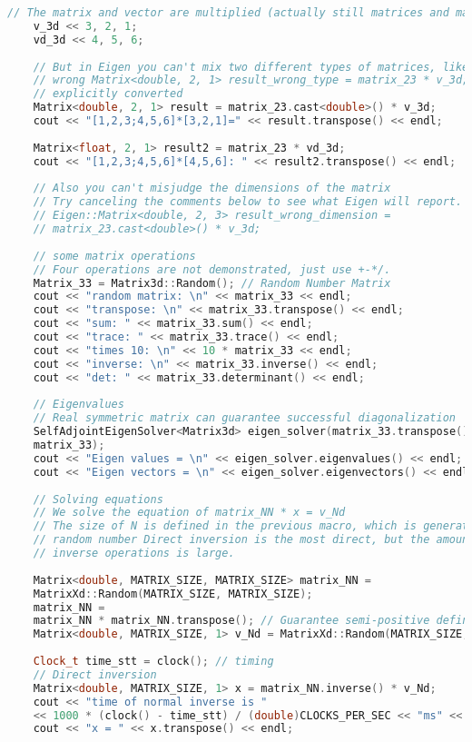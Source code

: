 \begin{lstlisting}[language=c++,caption=slambook2/ch3/useEigen/eigenMatrix.cpp]
    // The matrix and vector are multiplied (actually still matrices and matrices)
    v_3d << 3, 2, 1;
    vd_3d << 4, 5, 6;
    
    // But in Eigen you can't mix two different types of matrices, like this is
    // wrong Matrix<double, 2, 1> result_wrong_type = matrix_23 * v_3d; should be
    // explicitly converted
    Matrix<double, 2, 1> result = matrix_23.cast<double>() * v_3d;
    cout << "[1,2,3;4,5,6]*[3,2,1]=" << result.transpose() << endl;
    
    Matrix<float, 2, 1> result2 = matrix_23 * vd_3d;
    cout << "[1,2,3;4,5,6]*[4,5,6]: " << result2.transpose() << endl;
    
    // Also you can't misjudge the dimensions of the matrix
    // Try canceling the comments below to see what Eigen will report.
    // Eigen::Matrix<double, 2, 3> result_wrong_dimension =
    // matrix_23.cast<double>() * v_3d;
    
    // some matrix operations
    // Four operations are not demonstrated, just use +-*/.
    Matrix_33 = Matrix3d::Random(); // Random Number Matrix
    cout << "random matrix: \n" << matrix_33 << endl;
    cout << "transpose: \n" << matrix_33.transpose() << endl;
    cout << "sum: " << matrix_33.sum() << endl;
    cout << "trace: " << matrix_33.trace() << endl;
    cout << "times 10: \n" << 10 * matrix_33 << endl;
    cout << "inverse: \n" << matrix_33.inverse() << endl;
    cout << "det: " << matrix_33.determinant() << endl;
    
    // Eigenvalues
    // Real symmetric matrix can guarantee successful diagonalization
    SelfAdjointEigenSolver<Matrix3d> eigen_solver(matrix_33.transpose() *
    matrix_33);
    cout << "Eigen values = \n" << eigen_solver.eigenvalues() << endl;
    cout << "Eigen vectors = \n" << eigen_solver.eigenvectors() << endl;
    
    // Solving equations
    // We solve the equation of matrix_NN * x = v_Nd
    // The size of N is defined in the previous macro, which is generated by a
    // random number Direct inversion is the most direct, but the amount of
    // inverse operations is large.
    
    Matrix<double, MATRIX_SIZE, MATRIX_SIZE> matrix_NN =
    MatrixXd::Random(MATRIX_SIZE, MATRIX_SIZE);
    matrix_NN =
    matrix_NN * matrix_NN.transpose(); // Guarantee semi-positive definite
    Matrix<double, MATRIX_SIZE, 1> v_Nd = MatrixXd::Random(MATRIX_SIZE, 1);
    
    Clock_t time_stt = clock(); // timing
    // Direct inversion
    Matrix<double, MATRIX_SIZE, 1> x = matrix_NN.inverse() * v_Nd;
    cout << "time of normal inverse is "
    << 1000 * (clock() - time_stt) / (double)CLOCKS_PER_SEC << "ms" << endl;
    cout << "x = " << x.transpose() << endl;
    

\end{lstlisting}
